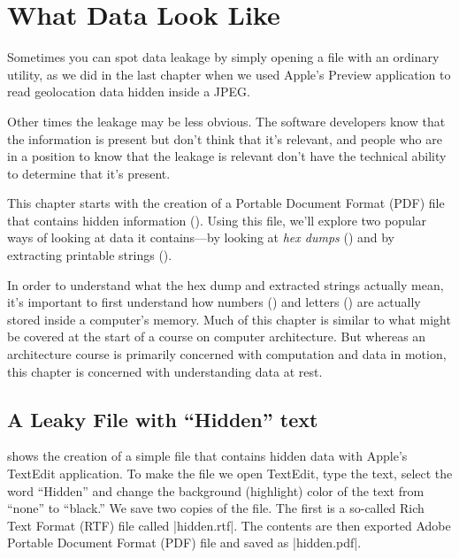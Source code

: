 \chapter{What Data Look Like}

Sometimes you can spot data leakage by simply opening a file with an
ordinary utility, as we did in the last chapter when we used Apple's
Preview application to read geolocation data hidden inside a JPEG. 

Other times the leakage may be less obvious.  The software developers
know that the information is present but don't think that it's
relevant, and people who are in a position to know that the leakage is
relevant don't have the technical ability to determine that it's
present.

This chapter starts with the creation of a Portable Document Format
(PDF) file that contains hidden information
(). Using this file, we'll explore two popular
ways of looking at data it contains---by looking at \emph{hex dumps}
() and by extracting printable strings
(). 

In order to understand what the hex dump and extracted strings
actually mean, it's important to first understand how numbers
() and letters () are actually
stored inside a computer's memory.  Much of this chapter is similar to
what might be covered at the start of a course on computer
architecture. But whereas an architecture course is primarily
concerned with computation and data in motion, this chapter is
concerned with understanding data at rest.

\section{A Leaky File with ``Hidden'' text}\label{sec:make-pdf}

 shows the creation of a simple file that
contains hidden data with Apple's TextEdit application. To make the
file we open TextEdit, type the text, select the word ``Hidden'' and
change the background (highlight) color of the text from ``none'' to
``black.'' We save two copies of the file. The first is a so-called
Rich Text Format (RTF) file called |hidden.rtf|. The contents are then
exported Adobe Portable Document Format (PDF) file and saved as |hidden.pdf|.



